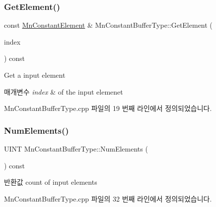 \subsubsection{\texorpdfstring{Get\+Element()}{GetElement()}}
{\footnotesize\ttfamily const \hyperlink{class_m_n_l_1_1_mn_constant_element}{Mn\+Constant\+Element} \& Mn\+Constant\+Buffer\+Type\+::\+Get\+Element (\begin{DoxyParamCaption}\item[{U\+I\+NT}]{index }\end{DoxyParamCaption}) const}

Get a input element 
\begin{DoxyParams}{매개변수}
{\em index} & of the input elemenet \\
\hline
\end{DoxyParams}


Mn\+Constant\+Buffer\+Type.\+cpp 파일의 19 번째 라인에서 정의되었습니다.

\mbox{\label{class_m_n_l_1_1_mn_constant_buffer_type_a1f7946e71fb2708c4e43066cb99cba4f}} 
\subsubsection{\texorpdfstring{Num\+Elements()}{NumElements()}}
{\footnotesize\ttfamily U\+I\+NT Mn\+Constant\+Buffer\+Type\+::\+Num\+Elements (\begin{DoxyParamCaption}{ }\end{DoxyParamCaption}) const}

\begin{DoxyReturn}{반환값}
count of input elements 
\end{DoxyReturn}


Mn\+Constant\+Buffer\+Type.\+cpp 파일의 32 번째 라인에서 정의되었습니다.

\mbox{\label{class_m_n_l_1_1_mn_constant_buffer_type_a12c8039ed9335db7db09f9628347080c}} 
